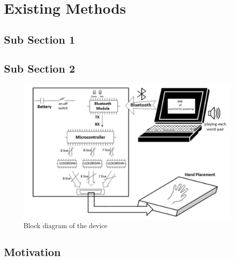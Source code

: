 \chapter{Existing Methods}
    \lipsum[2-3]

    \section{Sub Section 1}
    \lipsum[2-4]
    
    \section{Sub Section 2}
    
    
    \begin{figure}[H]
        \centering
        \includegraphics[width=400pt]{Images/device.png}
        \caption{Block diagram of the device}
    \end{figure}

    \lipsum[2]
    
    \section{Motivation}
    \lipsum[2]